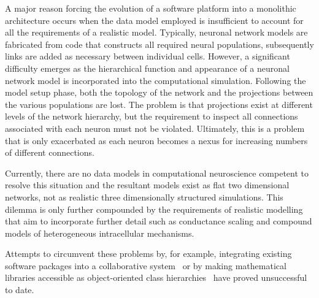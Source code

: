 \documentclass{article}
\begin{document}
A major reason forcing the evolution of a software platform into a monolithic architecture occurs when the data model employed is insufficient to account for all the requirements of a realistic model. Typically, neuronal network models are fabricated from code that constructs all required neural populations, subsequently links are added as necessary between individual cells. However, a significant difficulty emerges as the hierarchical function and appearance of a neuronal network model is incorporated into the computational simulation. Following the model setup phase, both the topology of the network and the projections between the various populations are lost. The problem is that projections exist at different levels of the network hierarchy, but the requirement to inspect all connections associated with each neuron must not be violated. Ultimately, this is a problem that is only exacerbated as each neuron becomes a nexus for increasing numbers of different connections.

Currently, there are no data models in computational neuroscience competent to resolve this situation and the resultant models exist as flat two dimensional networks, not as realistic three dimensionally structured simulations. This dilemma is only further compounded by the requirements of realistic modelling that aim to incorporate further detail such as conductance scaling and compound models of heterogeneous intracellular mechanisms.

Attempts to circumvent these problems by, for example, integrating existing software packages into a collaborative system~\cite{goddard01:_neosim} or by making mathematical libraries accessible as object-oriented class hierarchies~\cite{vibert01} have proved unsuccessful~\cite{cornelis03} to date.
\end{document}
